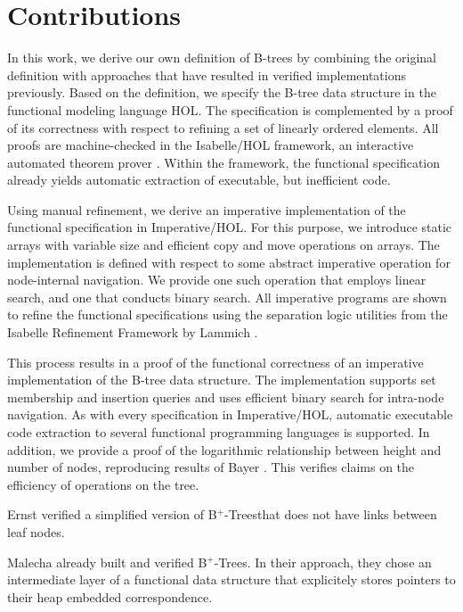 \documentclass[a4paper,UKenglish,cleveref, autoref, thm-restate]{lipics-v2021}
\newcommand{\btrees}{B$^+$-Trees}
\begin{document}
\section{Contributions}

In this work, we derive our own definition of B-trees
by combining the original definition
with approaches that have resulted in verified implementations previously.
Based on the definition, we specify the B-tree data structure in the
functional modeling language HOL.
The specification is complemented by a proof of its correctness
with respect to refining a set of linearly ordered elements.
All proofs are machine-checked in the Isabelle/HOL framework,
an interactive automated theorem prover \cite{DBLP:books/sp/NipkowK14}.
Within the framework,
the functional specification already yields automatic extraction of executable,
but inefficient code.

Using manual refinement, we derive an imperative implementation of the functional specification
in Imperative/HOL.
For this purpose, we introduce static arrays with variable size
and efficient copy and move operations on arrays.
The implementation is defined with respect to some abstract imperative
operation for node-internal navigation.
We provide one such operation that employs linear search,
and one that conducts binary search.
All imperative programs are shown to refine the functional specifications
using the separation logic utilities from the Isabelle Refinement Framework by
Lammich \cite{DBLP:journals/jar/Lammich19}.

This process results in a proof of the functional correctness
of an imperative implementation of the B-tree data structure.
The implementation supports set membership and insertion queries
and uses efficient binary search for intra-node navigation.
As with every specification in Imperative/HOL,
automatic executable code extraction to
several functional programming languages is supported.
In addition, we provide a proof of the logarithmic relationship between height and number of nodes,
reproducing results of Bayer \cite{DBLP:journals/acta/BayerM72}.
This verifies claims on the efficiency of
operations on the tree.


Ernst verified a simplified version of \btrees that does
not have links between leaf nodes.

Malecha already built and verified \btrees \cite{}.
In their approach, they chose an intermediate layer of a functional
data structure that explicitely stores pointers to their heap embedded
correspondence.
\end{document}
